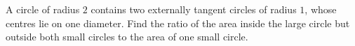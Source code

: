 A circle of radius $2$ contains two externally tangent circles of radius $1$, whose centres lie on one diameter. Find the ratio of the area inside the large circle but outside both small circles to the area of one small circle.
